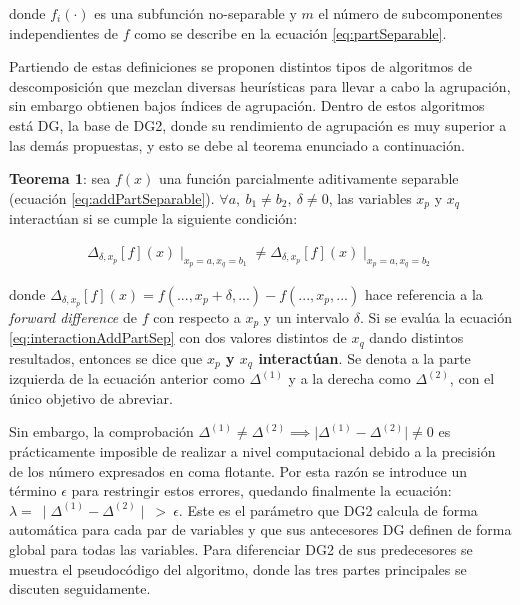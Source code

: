 donde $f_i(\cdot)$ es una subfunción no-separable y $m$ el número de subcomponentes independientes de $f$ como se describe en la ecuación \ref{eq:partSeparable}.

Partiendo de estas definiciones se proponen distintos tipos de algoritmos de descomposición que mezclan diversas heurísticas para llevar a cabo la agrupación, sin embargo obtienen bajos índices de agrupación. Dentro de estos algoritmos está DG\cite{DG}, la base de DG2, donde su rendimiento de agrupación es muy superior a las demás propuestas, y esto se debe al teorema enunciado a continuación.

\textbf{Teorema 1}: sea $f(x)$ una función parcialmente aditivamente separable (ecuación \ref{eq:addPartSeparable}). $\forall a, \ b_1 \neq b_2, \ \delta \neq 0$, las variables $x_p$ y $x_q$ interactúan si se cumple la siguiente condición:

\begin{equation}\label{eq:interactionAddPartSep}
	\begin{gathered}
		\Delta_{\delta,x_p} [f](x) \mid_{x_p = a,x_q=b_1} \neq \Delta_{\delta,x_p} [f](x) \mid_{x_p = a,x_q=b_2}
	\end{gathered}
\end{equation}

donde $\Delta_{\delta,x_p} [f](x)= f(...,x_p+\delta,...) -  f(...,x_p,...)$ hace referencia a la \textit{forward difference}\cite{DG} de $f$ con respecto a $x_p$ y un intervalo $\delta$. Si se evalúa la ecuación \ref{eq:interactionAddPartSep} con dos valores distintos de $x_q$ dando distintos resultados, entonces se dice que \textbf{$x_p$ y $x_q$ interactúan}. Se denota a la parte izquierda de la ecuación anterior como $\Delta^{(1) }$ y a la derecha como $\Delta^{(2)} $, con el único objetivo de abreviar.

Sin embargo, la comprobación $\Delta^{(1)} \neq \Delta^{(2)} \implies \mid \Delta^{(1)} - \Delta^{(2)}\mid \neq 0 $ es prácticamente imposible de realizar a nivel computacional debido a la precisión de los número expresados en coma flotante. Por esta razón se introduce un término $\epsilon$ para restringir estos errores, quedando finalmente la ecuación: $\lambda = \ \mid \Delta^{(1)} - \Delta^{(2)}\mid \ > \ \epsilon$. Este es el parámetro que DG2 calcula de forma automática para cada par de variables y que sus antecesores DG definen de forma global para todas las variables. Para diferenciar DG2 de sus predecesores se muestra el pseudocódigo del algoritmo, donde las tres partes principales se discuten seguidamente.

